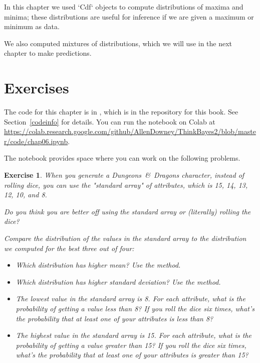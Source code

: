 \documentclass[12pt]{book}
\theoremstyle{exercise}
\newtheorem{exercise}{Exercise}[chapter]
\begin{document}
In this chapter we used `Cdf` objects to compute distributions of maxima and minima; these distributions are useful for inference if we are given a maximum or minimum as data.

We also computed mixtures of distributions, which we will use in the next chapter to make predictions.


\section{Exercises}

The code for this chapter is in , which is in the repository for this book.  See Section~\ref{codeinfo} for details.
You can run the notebook on Colab at \url{https://colab.research.google.com/github/AllenDowney/ThinkBayes2/blob/master/code/chap06.ipynb}.

The notebook provides space where you can work on the following problems.


\begin{exercise}
When you generate a {\it Dungeons~\&~Dragons} character, instead of rolling dice, you can use the "standard array" of attributes, which is 15, 14, 13, 12, 10, and 8.

Do you think you are better off using the standard array or (literally) rolling the dice?

Compare the distribution of the values in the standard array to the distribution we computed for the best three out of four:

\begin{itemize}

\item Which distribution has higher mean?  Use the  method.

\item Which distribution has higher standard deviation?  Use the  method.

\item The lowest value in the standard array is 8.  For each attribute, what is the probability of getting a value less than 8?  If you roll the dice six times, what's the probability that at least one of your attributes is less than 8?

\item The highest value in the standard array is 15.  For each attribute, what is the probability of getting a value greater than 15?  If you roll the dice six times, what's the probability that at least one of your attributes is greater than 15?

\end{itemize}

\end{exercise}
\end{document}
